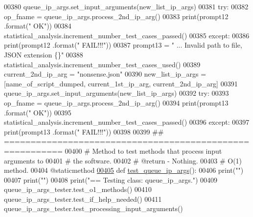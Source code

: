 \begin{DoxyCode}
00380         queue\_ip\_args.set\_input\_arguments(new\_list\_ip\_args)
00381         \textcolor{keywordflow}{try}:
00382             op\_fname = queue\_ip\_args.process\_2nd\_ip\_arg()
00383             print(prompt12 .format(\textcolor{stringliteral}{"    OK"}))
00384             statistical\_analysis.increment\_number\_test\_cases\_passed()
00385         \textcolor{keywordflow}{except}:
00386             print(prompt12 .format(\textcolor{stringliteral}{"    FAIL!!!"}))
00387         prompt13 = \textcolor{stringliteral}{"    ... Invalid path to file, JSON extension    \{\}"}
00388         statistical\_analysis.increment\_number\_test\_cases\_used()
00389         current\_2nd\_ip\_arg = \textcolor{stringliteral}{"nonsense.json"}
00390         new\_list\_ip\_args = [name\_of\_script\_dumped, current\_1st\_ip\_arg, current\_2nd\_ip\_arg]
00391         queue\_ip\_args.set\_input\_arguments(new\_list\_ip\_args)
00392         \textcolor{keywordflow}{try}:
00393             op\_fname = queue\_ip\_args.process\_2nd\_ip\_arg()
00394             print(prompt13 .format(\textcolor{stringliteral}{"    OK"}))
00395             statistical\_analysis.increment\_number\_test\_cases\_passed()
00396         \textcolor{keywordflow}{except}:
00397             print(prompt13 .format(\textcolor{stringliteral}{"    FAIL!!!"}))
00398 
00399     \textcolor{comment}{## =========================================================}
00400     \textcolor{comment}{#   Method to test methods that process input arguments to}
00401     \textcolor{comment}{#       the software.}
00402     \textcolor{comment}{#   @return - Nothing.}
00403     \textcolor{comment}{#   O(1) method.}
00404     @staticmethod
\hypertarget{queue__ip__arguments__tester_8py_source_l00405}{}\hyperlink{classutilities_1_1queue__ip__arguments__tester_1_1queue__ip__args__tester_aee90077323d94238d7f81b23e31207c3}{00405}     \textcolor{keyword}{def }\hyperlink{classutilities_1_1queue__ip__arguments__tester_1_1queue__ip__args__tester_aee90077323d94238d7f81b23e31207c3}{test\_queue\_ip\_args}():
00406         print(\textcolor{stringliteral}{""})
00407         print(\textcolor{stringliteral}{""})
00408         print(\textcolor{stringliteral}{"==   Testing class: queue\_ip\_args."})
00409         queue\_ip\_args\_tester.test\_o1\_methods()
00410         queue\_ip\_args\_tester.test\_if\_help\_needed()
00411         queue\_ip\_args\_tester.test\_processing\_input\_arguments()
\end{DoxyCode}
